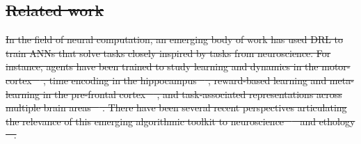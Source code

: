 \documentclass[5p,twocolumn,authoryear]{elsarticle}
\providecommand{\DIFaddtex}[1]{{\protect\color{blue}\uwave{#1}}} %
\providecommand{\DIFdeltex}[1]{{\protect\color{red}\sout{#1}}}                      %
\providecommand{\DIFaddbegin}{} %
\providecommand{\DIFaddend}{} %
\providecommand{\DIFdelend}{} %
\providecommand{\DIFadd}[1]{\texorpdfstring{\DIFaddtex{#1}}{#1}} %
\providecommand{\DIFdel}[1]{\texorpdfstring{\DIFdeltex{#1}}{}} %
\newcommand{\DIFaddincludegraphics}[2][]{{\color{blue}\fbox{\DIFOincludegraphics[#1]{#2}}}} %
\DeclareRobustCommand{\DIFaddbegin}{\DIFOaddbegin \let\includegraphics\DIFaddincludegraphics} %
\DeclareRobustCommand{\DIFaddend}{\DIFOaddend \let\includegraphics\DIFOincludegraphics} %
\DeclareRobustCommand{\DIFdelend}{\DIFOaddend \let\includegraphics\DIFOincludegraphics} %
\begin{document}
\subsection{\DIFdel{Related work}}
\addtocounter{subsection}{-1}%
\DIFdel{In the field of neural computation, an emerging body of work has used DRL to train ANNs that solve tasks closely inspired by tasks from neuroscience.
For instance, agents have been trained to study learning and dynamics in the motor-cortex \mbox{%
\citep{weinstein2017structure, song2020deep}}\hspace{0pt}%
, time encoding in the hippocampus \mbox{%
\citep{lin2021time}}\hspace{0pt}%
, reward-based learning and meta-learning in the pre-frontal cortex \mbox{%
\citep{song2017reward, wang2018prefrontal, botvinick2019reinforcement}}\hspace{0pt}%
, and task-associated representations across multiple brain areas \mbox{%
\citep{cross2021using}}\hspace{0pt}%
.
There have been several recent perspectives articulating the relevance of this emerging algorithmic toolkit to neuroscience \mbox{%
\citep{botvinick2020deep,gershman2020neurobiology} }\hspace{0pt}%
and ethology \mbox{%
\citep{crosby2020building}}\hspace{0pt}%
.
}\DIFdelend \DIFaddbegin \DIFadd{.
}\DIFaddend 
\end{document}
